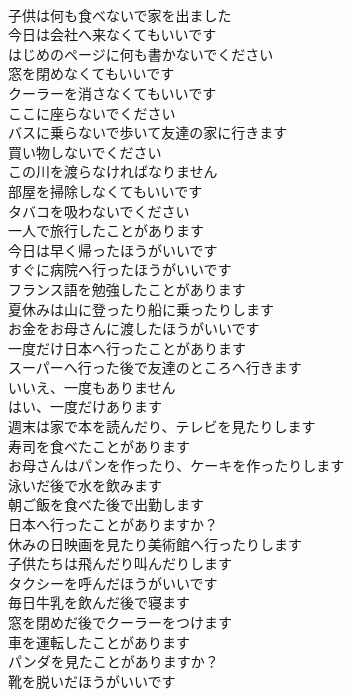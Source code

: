 \documentclass[8pt]{extreport}
\begin{document}
\begin{CJK}{UTF8}{min}
\\	子供は何も食べないで家を出ました	
\\	今日は会社へ来なくてもいいです	
\\	はじめのページに何も書かないでください	
\\	窓を閉めなくてもいいです	
\\	クーラーを消さなくてもいいです	
\\	ここに座らないでください	
\\	バスに乗らないで歩いて友達の家に行きます	
\\	買い物しないでください	
\\	この川を渡らなければなりません	
\\	部屋を掃除しなくてもいいです	
\\	タバコを吸わないでください	
\\	一人で旅行したことがあります	
\\	今日は早く帰ったほうがいいです	
\\	すぐに病院へ行ったほうがいいです	
\\	フランス語を勉強したことがあります	
\\	夏休みは山に登ったり船に乗ったりします	
\\	お金をお母さんに渡したほうがいいです	
\\	一度だけ日本へ行ったことがあります	
\\	スーパーへ行った後で友達のところへ行きます	
\\	いいえ、一度もありません	
\\	はい、一度だけあります	
\\	週末は家で本を読んだり、テレビを見たりします	
\\	寿司を食べたことがあります	
\\	お母さんはパンを作ったり、ケーキを作ったりします	
\\	泳いだ後で水を飲みます	
\\	朝ご飯を食べた後で出勤します	
\\	日本へ行ったことがありますか？	
\\	休みの日映画を見たり美術館へ行ったりします	
\\	子供たちは飛んだり叫んだりします	
\\	タクシーを呼んだほうがいいです	
\\	毎日牛乳を飲んだ後で寝ます	
\\	窓を閉めだ後でクーラーをつけます	
\\	車を運転したことがあります	
\\	パンダを見たことがありますか？	
\\	靴を脱いだほうがいいです	

\end{CJK}
\end{document}
